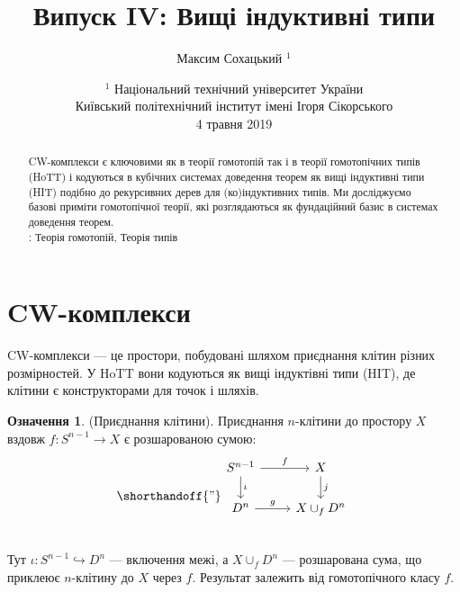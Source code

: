 \documentclass{article}
\theoremstyle{definition}
\newtheorem{definition}{Означення}
\newcommand*{\incmap}{\hookrightarrow}
\begin{document}
\title{Випуск IV: Вищі індуктивні типи}
\author{Максим Сохацький $^1$}
\date{ $^1$ Національний технічний університет України \\
       \small Київський політехнічний інститут імені Ігоря Сікорського \\
       4 травня 2019 }
\maketitle

\begin{abstract}
CW-комплекси є ключовими як в теорії гомотопій так і в теорії гомотопічних типів (HoTT) і кодуються
в кубічних системах доведення теорем як вищі індуктивні типи (HIT) подібно до рекурсивних
дерев для (ко)індуктивних типів. Ми досліджуємо базові приміти гомотопічної теорії,
які розглядаються як фундаційний базис в системах доведення теорем. \\
: Теорія гомотопій, Теорія типів
\end{abstract}

\tableofcontents

\section{CW-комплекси}
CW-комплекси — це простори, побудовані шляхом приєднання клітин різних
розмірностей. У HoTT вони кодуються як вищі індуктівні типи (HIT),
де клітини є конструкторами для точок і шляхів.

\begin{definition} (Приєднання клітини).
Приєднання $n$-клітини до простору \( X \)
вздовж \( f : S^{n-1} \to X \) є розшарованою сумою:
\[
\shorthandoff{"}
\begin{tikzcd}
S^{n-1} \arrow[r, "f"] \arrow[d, "\iota"] & X \arrow[d, "j"] \\
D^n \arrow[r, "g"]                        & X \cup_f D^n \\
\end{tikzcd}
\]
Тут \( \iota : S^{n-1} \incmap D^n \) — включення межі,
а \( X \cup_f D^n \) — розшарована сума, що приклеює \( n \)-клітину до \( X \) через \( f \). Результат залежить від
гомотопічного класу \( f \).
\end{definition}
\end{document}

